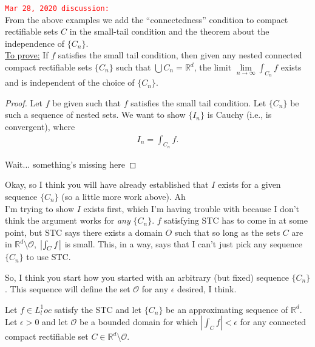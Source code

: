 \documentclass{article}
\theoremstyle{definition}
\begin{document}
\begin{framed}

\textcolor{red}{\texttt{Mar 28, 2020 discussion:}}\\

From the above examples we add the ``connectedness'' condition to compact rectifiable sets $C$ in the small-tail condition and the theorem about the independence of $\{ C_n \}$.\\

\underline{To prove:} If $f$ satisfies the small tail condition, then given any nested connected compact rectifiable sets $\{C_n\}$ such that $\bigcup C_n = \mathbb{R}^d$, the limit $\lim\limits_{n\to\infty}\int_{C_n}f$ exists and is independent of the choice of $\{ C_n \}$. \\

\begin{proof}
Let $f$ be given such that $f$ satisfies the small tail condition. Let $\{C_n\}$ be such a sequence of nested sets. We want to show $\{ I_n \}$ is Cauchy (i.e., is convergent), where
\begin{align*}
    I_n = \int_{C_n}f.
\end{align*}

Wait... something's missing here

\end{proof}



Okay, so I think you will have already established that $I$ exists for a given sequence $\{C_n\}$ (so a little more work above). Ah\\


I'm trying to show $I$ exists first, which I'm having trouble with because I don't think the argument works for \textit{any} $\{C_n\}$. $f$ satisfying STC has to come in at some point, but STC says there exists a domain $O$ such that so long as the sets $C$ are in $\mathbb{R}^d\setminus \mathcal{O}$, $\abs{\int_C f}$ is small. This, in a way, says that I can't just pick any sequence $\{C_n \}$ to use STC.

So, I think you start how you started with an arbitrary (but fixed) sequence $\{C_n\}$. This sequence will define the set $\mathcal{O}$ for any $\epsilon$ desired, I think.

Let $f\in L^1_loc$ satisfy the STC and let $\{C_n\}$ be an approximating sequence of $\mathbb{R}^d$. Let $\epsilon>0$ and let $\mathcal{O}$ be a bounded domain for which $\left|\int_C f\right|<\epsilon$ for any connected compact rectifiable set $C\in \mathbb{R}^d\setminus \mathcal{O}$.


\end{framed}
\end{document}
